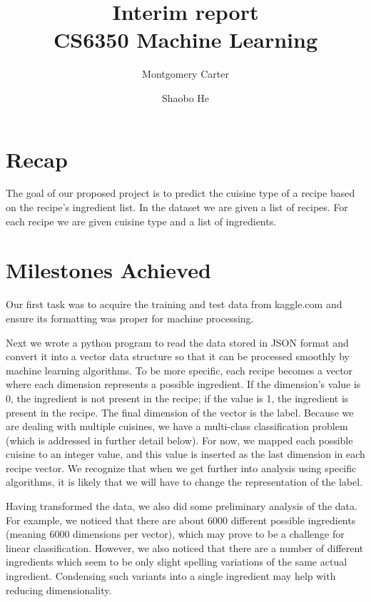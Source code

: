 \documentclass[11pt]{article}
\title{Interim report\\CS6350 Machine Learning}
\author{Montgomery Carter \and Shaobo He}
\begin{document}
\maketitle

\section{Recap}
The goal of our proposed project is to predict the cuisine type of a
recipe based on the recipe's ingredient list\cite{kaggle-link}.  In
the dataset we are given a list of recipes.  For each recipe we are
given cuisine type and a list of ingredients.

\section{Milestones Achieved}
\label{sec:background}
Our first task was to acquire the training and test
data\cite{download-link} from kaggle.com and ensure its formatting
was proper for machine processing.

Next we wrote a python program to read the data stored in JSON format
and convert it into a vector data structure so that it can be
processed smoothly by machine learning algorithms. To be more 
specific, each recipe becomes a vector where each dimension represents
a possible ingredient.  If the dimension's value is 0, the ingredient
is not present in the recipe; if the value is 1, the ingredient is
present in the recipe.  The final dimension of the vector is the
label.  Because we are dealing with multiple cuisines, we have a
multi-class classification problem (which is addressed in further
detail below).  For now, we mapped each possible cuisine to an integer
value, and this value is inserted as the last dimension in each recipe
vector.  We recognize that when we get further into analysis using
specific algorithms, it is likely that we will have to change the
representation of the label. 

Having transformed the data, we also did some preliminary analysis of
the data.  For example, we noticed that there are about 6000 different
possible ingredients (meaning 6000 dimensions per vector), which may
prove to be a challenge for linear classification.  However, we also
noticed that there are a number of different ingredients which seem to
be only slight spelling variations of the same actual ingredient.
Condensing such variants into a single ingredient may help with
reducing dimensionality.
\end{document}
